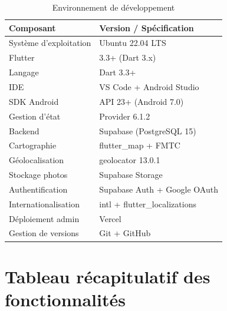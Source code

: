 \documentclass[12pt,a4paper]{report}
\begin{document}
{\small
\begin{table}[H]
    \centering
    \begin{tabular}{|l|l|}
        \hline
        \rowcolor{supnumgreen!20}
        \textbf{Composant} & \textbf{Version / Spécification} \\
        \hline
        Système d'exploitation & Ubuntu 22.04 LTS \\
        \hline
        Flutter & 3.3+ (Dart 3.x) \\
        \hline
        Langage & Dart 3.3+ \\
        \hline
        IDE & VS Code + Android Studio \\
        \hline
        SDK Android & API 23+ (Android 7.0) \\
        \hline
        Gestion d'état & Provider 6.1.2 \\
        \hline
        Backend & Supabase (PostgreSQL 15) \\
        \hline
        Cartographie & flutter\_map + FMTC \\
        \hline
        Géolocalisation & geolocator 13.0.1 \\
        \hline
        Stockage photos & Supabase Storage \\
        \hline
        Authentification & Supabase Auth + Google OAuth \\
        \hline
        Internationalisation & intl + flutter\_localizations \\
        \hline
        Déploiement admin & Vercel \\
        \hline
        Gestion de versions & Git + GitHub \\
        \hline
    \end{tabular}
    \caption{Environnement de développement}
    \label{tab:dev-env}
\end{table}
}

\section{Tableau récapitulatif des fonctionnalités}
\end{document}
